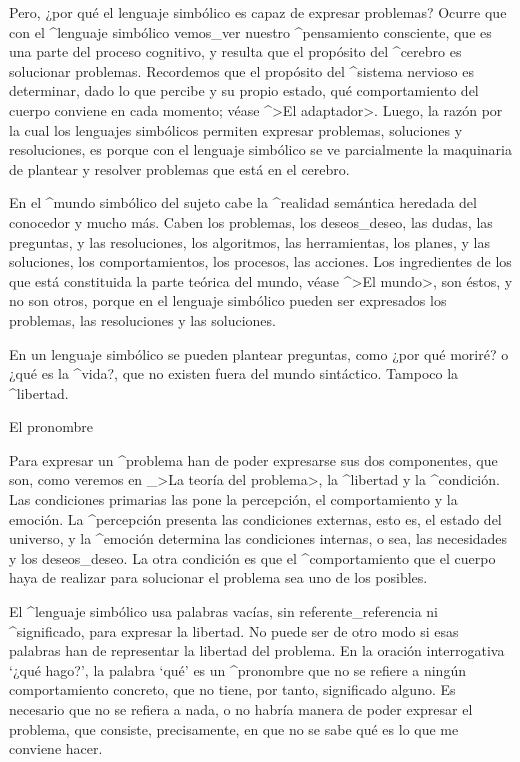 Pero, ¿por qué el lenguaje simbólico es capaz de expresar problemas?
Ocurre que con el ^{lenguaje simbólico} vemos_{ver} nuestro
^{pensamiento} consciente, que es una parte del proceso cognitivo, y
resulta que el propósito del ^{cerebro} es solucionar problemas.
Recordemos que el propósito del ^{sistema nervioso} es determinar, dado
lo que percibe y su propio estado, qué comportamiento del cuerpo
conviene en cada momento; véase ^>El adaptador>. Luego, la razón por la
cual los lenguajes simbólicos permiten expresar problemas, soluciones y
resoluciones, es porque con el lenguaje simbólico se ve parcialmente la
maquinaria de plantear y resolver problemas que está en el cerebro.

En el ^{mundo} simbólico del sujeto cabe la ^{realidad} semántica
heredada del conocedor y mucho más. Caben los problemas, los
deseos_{deseo}, las dudas, las preguntas, y las resoluciones, los
algoritmos, las herramientas, los planes, y las soluciones, los
comportamientos, los procesos, las acciones. Los ingredientes de los que
está constituida la parte teórica del mundo, véase ^>El mundo>, son
éstos, y no son otros, porque en el lenguaje simbólico pueden ser
expresados los problemas, las resoluciones y las soluciones.

En un lenguaje simbólico se pueden plantear preguntas, como ¿por qué
moriré? o ¿qué es la ^{vida}?, que no existen fuera del mundo
sintáctico. Tampoco la ^{libertad}.


\Section El pronombre

Para expresar un ^{problema} han de poder expresarse sus dos
componentes, que son, como veremos en _>La teoría del problema>, la
^{libertad} y la ^{condición}. Las condiciones primarias las pone la
percepción, el comportamiento y la emoción. La ^{percepción} presenta
las condiciones externas, esto es, el estado del universo, y la
^{emoción} determina las condiciones internas, o sea, las necesidades y
los deseos_{deseo}. La otra condición es que el ^{comportamiento} que
el cuerpo haya de realizar para solucionar el problema sea uno de los
posibles.

El ^{lenguaje simbólico} usa palabras vacías, sin referente_{referencia}
ni ^{significado}, para expresar la libertad. No puede ser de otro modo
si esas palabras han de representar la libertad del problema. En la
oración interrogativa `¿qué hago?', la palabra `qué' es un ^{pronombre}
que no se refiere a ningún comportamiento concreto, que no tiene, por
tanto, significado alguno. Es necesario que no se refiera a nada, o no
habría manera de poder expresar el problema, que consiste, precisamente,
en que no se sabe qué es lo que me conviene hacer.

